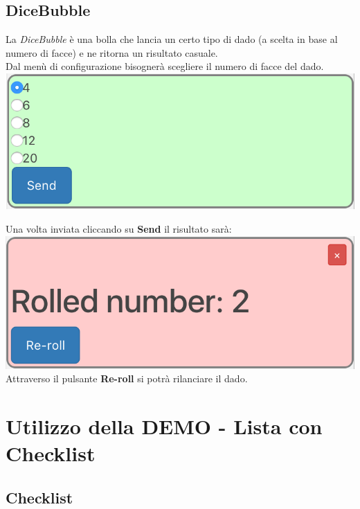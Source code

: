 \subsection{DiceBubble}
La \textit{DiceBubble} è una bolla che lancia un certo tipo di dado (a scelta in base al numero di facce) e ne ritorna un risultato casuale.\\
Dal menù di configurazione bisognerà scegliere il numero di facce del dado.\\

\includegraphics[scale=0.75]{img/randConfig.png}

Una volta inviata cliccando su \textbf{Send} il risultato sarà:\\

\includegraphics[scale=0.75]{img/rand.png}
\\
Attraverso il pulsante \textbf{Re-roll} si potrà rilanciare il dado.

\newpage

\section{Utilizzo della DEMO - Lista con Checklist}

\subsection{Checklist}

